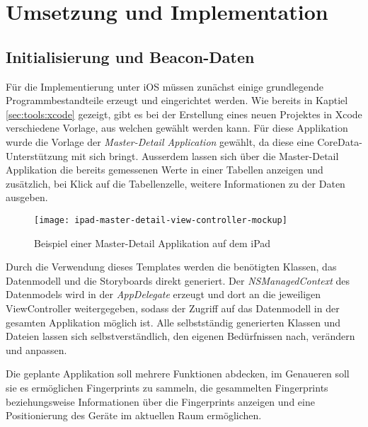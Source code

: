 \chapter{Umsetzung und Implementation}
\label{chap:implementation}


\section{Initialisierung und Beacon-Daten}
\label{sec:implementation:initandbeacon}


Für die Implementierung unter iOS müssen zunächst einige grundlegende Programmbestandteile erzeugt und eingerichtet werden.
Wie bereits in Kaptiel \ref{sec:tools:xcode} gezeigt, gibt es bei der Erstellung eines neuen Projektes in Xcode verschiedene Vorlage, aus welchen gewählt werden kann. Für diese Applikation wurde die Vorlage der \emph{Master-Detail Application} gewählt, da diese eine CoreData-Unterstützung mit sich bringt. Ausserdem lassen sich über die Master-Detail Applikation die bereits gemessenen Werte in einer Tabellen anzeigen und zusätzlich, bei Klick auf die Tabellenzelle, weitere Informationen zu der Daten ausgeben.

\begin{figure}[htb!]
		\centering
	\texttt{[image: ipad-master-detail-view-controller-mockup]}
	\caption{Beispiel einer Master-Detail Applikation auf dem iPad}
	\label{master-detail-view-controller}
\end{figure}

Durch die Verwendung dieses Templates werden die benötigten Klassen, das Datenmodell und die Storyboards direkt generiert. Der \emph{NSManagedContext} des Datenmodels wird in der \emph{AppDelegate} erzeugt und dort an die jeweiligen ViewController weitergegeben, sodass der Zugriff auf das Datenmodell in der gesamten Applikation möglich ist. Alle selbstständig generierten Klassen und Dateien lassen sich selbstverständlich, den eigenen Bedürfnissen nach, verändern und anpassen.

Die geplante Applikation soll mehrere Funktionen abdecken, im Genaueren soll sie es ermöglichen Fingerprints zu sammeln, die gesammelten Fingerprints beziehungsweise Informationen über die Fingerprints anzeigen und eine Positionierung des Geräte im aktuellen Raum ermöglichen.

